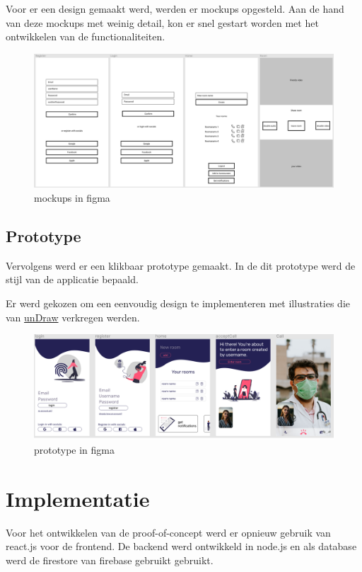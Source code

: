 			Voor er een design gemaakt werd, werden er mockups opgesteld.
			Aan de hand van deze mockups met weinig detail, kon er snel gestart worden met het ontwikkelen van de functionaliteiten. \autocite{Tate2019}
			\begin{figure}[H]
				\centering
				\includegraphics[width=140mm]{./img/mockup-poc.png}{}
				\caption{mockups in figma}
			\end{figure}
		
		
		\subsection{Prototype}
		
			Vervolgens werd er een klikbaar prototype gemaakt. In de dit prototype werd de stijl van de applicatie bepaald.
			
			Er werd gekozen om een eenvoudig design te implementeren met illustraties die van \href{https://undraw.co/}{unDraw} verkregen werden.
			
			\begin{figure}[H]
				\centering
				\includegraphics[width=140mm]{./img/prototype-poc.png}{}
				\caption{prototype in figma}
			\end{figure}
			
	
\section{Implementatie}
	Voor het ontwikkelen van de proof-of-concept werd er opnieuw gebruik van react.js voor de frontend. De backend werd ontwikkeld in node.js en als database werd de firestore van firebase gebruikt gebruikt.
	
